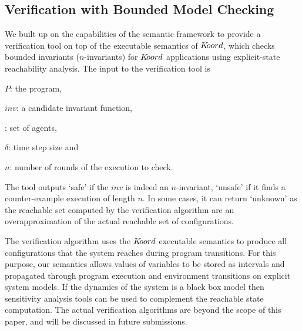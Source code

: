 \subsection{Verification with Bounded Model Checking}
\label{sec:bmc}


We built up on the capabilities of the \K semantic framework to provide a verification tool on top of the executable semantics of $K\kern-2pt oord$, which checks bounded invariants ($n$-invariants) for $K\kern-2pt oord$ applications using explicit-state reachability analysis. The input to the verification tool is 
\begin{inparaenum}[(i)] 
    \item $P$: the program, 
    \item $\mathit{inv}$: a candidate invariant function, 
    \item {\UINS}: set of agents, 
    \item $\delta$: time step size and 
    \item $n$: number of rounds of the execution to check.
\end{inparaenum}

The tool outputs `safe' if the $\mathit{inv}$ is indeed an $n$-invariant, `unsafe' if it finds a counter-example execution of length $n$. In some cases, it can return `unknown' as the reachable set computed by the verification algorithm are an overapproximation of the actual reachable set of configurations.  

The verification algorithm uses the $K\kern-2pt oord$ executable semantics to produce all configurations that the system reaches during program transitions. For this purpose, our semantics allows values of variables to be stored as intervals and propagated through program execution and environment transitions on explicit system models. If the dynamics of the system is a black box model then sensitivity analysis tools can be used to complement the reachable state computation. The actual verification algorithms are beyond the scope of this paper, and will be discussed in future submissions.

